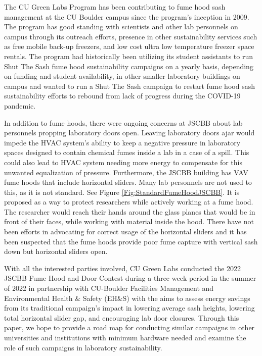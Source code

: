 \documentclass[12pt, twocolumn]{article}
\begin{document}
	The CU Green Labs Program has been contributing to fume hood sash management at the CU Boulder campus since the program's inception in 2009. The program has good standing with scientists and other lab personnels on campus through its outreach efforts, presence in other sustainability services such as free mobile back-up freezers, and low cost ultra low temperature freezer space rentals. The program had historically been utilizing its student assistants to run Shut The Sash fume hood sustainability campaigns on a yearly basis, depending on funding and student availability, in other smaller laboratory buildings on campus and wanted to run a Shut The Sash campaign to restart fume hood sash sustainability efforts to rebound from lack of progress during the COVID-19 pandemic. 
	
	In addition to fume hoods, there were ongoing concerns at JSCBB about lab personnels propping laboratory doors open. Leaving laboratory doors ajar would impede the HVAC system's ability to keep a negative pressure in laboratory spaces designed to contain chemical fumes inside a lab in a case of a spill. This could also lead to HVAC system needing more energy to compensate for this unwanted equalization of pressure. Furthermore, the JSCBB building has VAV fume hoods that include horizontal sliders. Many lab personnels are not used to this, as it is not standard. See Figure \ref{Fig:StandardFumeHoodJSCBB}. It is proposed as a way to protect researchers while actively working at a fume hood. The researcher would reach their hands around the glass planes that would be in front of their faces, while working with material inside the hood. There have not been efforts in advocating for correct usage of the horizontal sliders and it has been suspected that the fume hoods provide poor fume capture with vertical sash down but horizontal sliders open. 
	
	With all the interested parties involved, CU Green Labs conducted the 2022 JSCBB Fume Hood and Door Contest during a three week period in the summer of 2022 in partnership with CU-Boulder Facilities Management and Environmental Health \& Safety (EH\&S) with the aims to assess energy savings from its traditional campaign's impact in lowering average sash heights, lowering total horizontal slider gap, and encouraging lab door closures. Through this paper, we hope to provide a road map for conducting similar campaigns in other universities and institutions with minimum hardware needed and examine the role of such campaigns in laboratory sustainability. 
\end{document}
